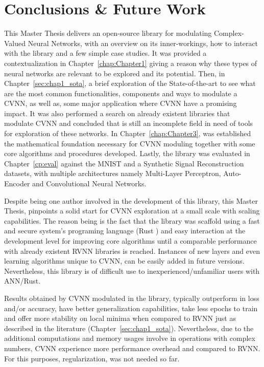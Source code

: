 \chapter{Conclusions \& Future Work}

This Master Thesis delivers an open-source library for modulating Complex-Valued Neural Networks, with an overview on its inner-workings, how to interact with the library and a few simple case studies. It was provided a contextualization in Chapter~\ref{chap:Chapter1} giving a reason why these types of neural networks are relevant to be explored and its potential. Then, in Chapter~\ref{sec:chap1_sota}, a brief exploration of the State-of-the-art to see what are the most common functionalities, components and ways to modulate a CVNN, as well as, some major application where CVNN have a promising impact. It was also performed a search on already existent libraries that modulate CVNN and concluded that is still an incomplete field in need of tools for exploration of these networks. In Chapter~\ref{chap:Chapter3}, was established the mathematical foundation necessary for CVNN moduling together with some core algorithms and procedures developed. Lastly, the library was evaluated in Chapter~\ref{cp:eval} against the MNIST and a Synthetic Signal Reconstruction datasets, with multiple architectures namely Multi-Layer Perceptron, Auto-Encoder and Convolutional Neural Networks.

Despite being one author involved in the development of this library, this Master Thesis, pinpoints a solid start for CVNN exploration at a small scale with scaling capabilities. The reason being is the fact that the library was scaffold using a fast and secure system's programing language (Rust \parencite{rust2018}) and easy interaction at the development level for improving core algorithms until a comparable performance with already existent RVNN libraries is reached. Instances of new layers and even learning algorithms unique to CVNN, can be easily added in future versions. Nevertheless, this library is of difficult use to inexperienced/unfamiliar users with ANN/Rust.

Results obtained by CVNN modulated in the library, typically outperform in loss and/or accuracy, have better generalization capabilities, take less epochs to train and offer more stability on local minima when compared to RVNN just as described in the literature (Chapter~\ref{sec:chap1_sota}). Nevertheless, due to the additional computations and memory usages involve in operations with complex numbers, CVNN experience more performance overhead and compared to RVNN. For this purposes, regularization, was not needed so far.

